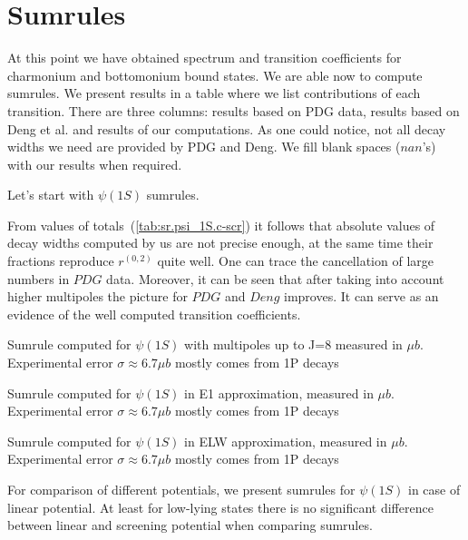 \chapter{Sumrules}

At this point we have obtained spectrum and transition coefficients for charmonium and bottomonium bound states. We are able now to compute sumrules. We present results in a table where we list contributions of each transition. There are three columns: results based on PDG data, results based on Deng et al. and results of our computations. As one could notice, not all decay widths we need are provided by PDG and Deng. We fill blank spaces ($nan$'s) with our results when required.

Let's start with $\psi(1S)$ sumrules.

From values of totals~(\cref{tab:sr.psi_1S.c-scr}) it follows that absolute values of decay widths computed by us are not precise enough, at the same time their fractions reproduce $r^{(0,2)}$ quite well. One can trace the cancellation of large numbers in $PDG$ data. Moreover, it can be seen that after taking into account higher multipoles the picture for $PDG$ and $Deng$ improves. It can serve as an evidence of the well computed transition coefficients.

\begin{table}[H]
    {\caption{Sumrule computed for $\psi(1S)$ with multipoles up to J=8 measured in $\mu b$. Experimental error $\sigma \approx 6.7 \mu b$ mostly comes from 1P decays \label{tab:sr.psi_1S.c-scr}}}
    
\end{table}

\begin{table}[H]
    {\caption{Sumrule computed for $\psi(1S)$ in E1 approximation, measured in $\mu b$. Experimental error $\sigma \approx 6.7 \mu b$ mostly comes from 1P decays \label{tab:srE1.psi_1S.c-scr}}}
    
\end{table}

\begin{table}[H]
    {\caption{Sumrule computed for $\psi(1S)$ in ELW approximation, measured in $\mu b$. Experimental error $\sigma \approx 6.7 \mu b$ mostly comes from 1P decays \label{tab:srELW.psi_1S.c-scr}}}
    
\end{table}

For comparison of different potentials, we present sumrules for $\psi(1S)$ in case of linear potential. At least for low-lying states there is no significant difference between linear and screening potential when comparing sumrules.

